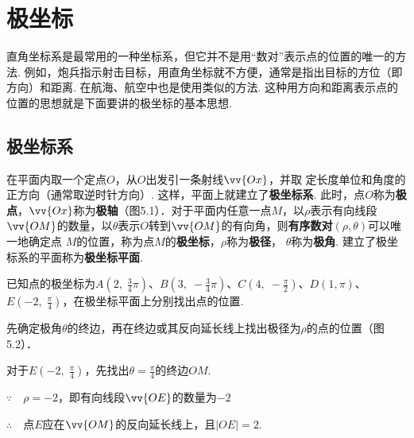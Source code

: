 \chapter{极坐标}

直角坐标系是最常用的一种坐标系，但它并不是用“数对”表示点的位置的唯一的方法. 例如，炮兵指示射击目标，用直角坐标就不方便，通常是指出目标的方位（即方向）和距离. 在航海、航空中也是使用类似的方法. 这种用方向和距离表示点的位置的思想就是下面要讲的极坐标的基本思想.

\section{极坐标系}
在平面内取一个定点$O$，从$O$出发引一条射线$\vv{Ox}$，并取
定长度单位和角度的正方向（通常取逆时针方向）. 这样，平面上就建立了\textbf{极坐标系}. 此时，点$O$称为\textbf{极点}，$\vv{Ox}$称为\textbf{极轴}（图5.1）．对于平面内任意一点$M$，以$\rho$表示有向线段$\vv{OM}$的数量，以$\theta$表示$O$转到$\vv{OM}$的有向角，则\textbf{有序数对}$(\rho,\theta)$可以唯一地确定点
$M$的位置，称为点$M$的\textbf{极坐标}，$\rho$称为\textbf{极径}，
$\theta$称为\textbf{极角}. 建立了极坐标系的平面称为\textbf{极坐标平面}.

\begin{figure}[htp]
    \centering
{}    
    \caption{}
\end{figure}

\begin{example}
已知点的极坐标为$A\left(2,\; \frac{3}{4}\pi\right)$、$B\left(3,\; -\frac{3}{4}\pi\right)$、$C\left(4,\; -\frac{\pi}{2}\right)$、$D\left(1,\pi\right)$、$E\left(-2,\; \frac{\pi}{4}\right)$，在极坐标平面上分别找出点的位置.
\end{example}

\begin{solution}
先确定极角$\theta$的终边，再在终边或其反向延长线上找出极径为$\rho$的点的位置（图5.2）．

    对于$E\left(-2,\; \frac{\pi}{4}\right)$，先找出$\theta=\frac{\pi}{4}$的终边$OM$.

$\because\quad \rho=-2$，即有向线段$\vv{OE}$的数量为$-2$

$\therefore\quad $点$E$应在$\vv{OM}$的反向延长线上，且$|OE|=2$.
\end{solution}


